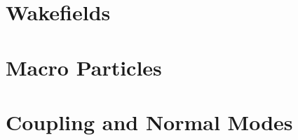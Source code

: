 \section{Wakefields}
\label{s:wakefields}



\section{Macro Particles}
\label{s:macro}



\section{Coupling and Normal Modes}
\label{s:coupling}
